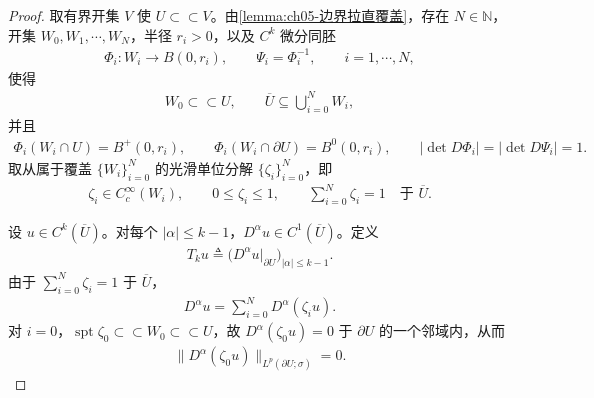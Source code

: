 \documentclass[../../main.tex]{subfiles}%
\begin{document}
\begin{proof}
取有界开集 $V$ 使 $U\subset\subset V$。由\cref{lemma:ch05-边界拉直覆盖}，存在 $N\in\mathbb{N}$，开集 $W_{0},W_{1},\cdots,W_{N}$，半径 $r_{i}>0$，以及 $C^{k}$ 微分同胚
\begin{align*}
\Phi_{i}:W_{i}\longrightarrow B(0,r_{i}),
\qquad
\Psi_{i}=\Phi_{i}^{-1},
\qquad i=1,\cdots,N,
\end{align*}
使得
\begin{align*}
W_{0}\subset\subset U,
\qquad
\overline{U}\subseteq\bigcup_{i=0}^{N}W_{i},
\end{align*}
并且
\begin{align*}
\Phi_{i}(W_{i}\cap U)=B^{+}(0,r_{i}),
\qquad
\Phi_{i}(W_{i}\cap\partial U)=B^{0}(0,r_{i}),
\qquad
|\det D\Phi_{i}|=|\det D\Psi_{i}|=1.
\end{align*}
取从属于覆盖 $\{W_{i}\}_{i=0}^{N}$ 的光滑单位分解 $\{\zeta_{i}\}_{i=0}^{N}$，即
\begin{align*}
\zeta_{i}\in C^{\infty}_{c}(W_{i}),
\qquad
0\leqslant\zeta_{i}\leqslant1,
\qquad
\sum_{i=0}^{N}\zeta_{i}=1\quad\text{于 }\overline{U}.
\end{align*}

设 $u\in C^{k}(\overline{U})$。对每个 $|\alpha|\leqslant k-1$，$D^{\alpha}u\in C^{1}(\overline{U})$。定义
\begin{align}
T_{k}u\triangleq\bigl(D^{\alpha}u|_{\partial U}\bigr)_{|\alpha|\leqslant k-1}.
\label{eq:ch05-证明-Ck定义}
\end{align}
由于 $\sum_{i=0}^{N}\zeta_{i}=1$ 于 $\overline{U}$，
\begin{align*}
D^{\alpha}u=\sum_{i=0}^{N}D^{\alpha}(\zeta_{i}u).
\end{align*}
对 $i=0$，$\operatorname{spt}\zeta_{0}\subset\subset W_{0}\subset\subset U$，故 $D^{\alpha}(\zeta_{0}u)=0$ 于 $\partial U$ 的一个邻域内，从而
\begin{align*}
\|D^{\alpha}(\zeta_{0}u)\|_{L^{p}(\partial U;\sigma)}=0.
\end{align*}


\end{proof}
\end{document}
